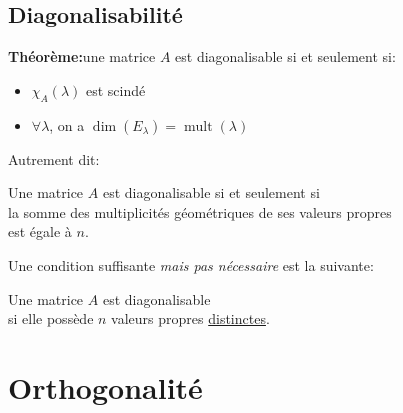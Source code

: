 \documentclass{article}
\newcommand\thm{\textbf{Théorème:}}
\DeclareMathOperator{\mult}{mult}
\begin{document}
\subsection{Diagonalisabilité}
\thm une matrice \(A\) est diagonalisable si et seulement si:
\begin{itemize}
	\item \(\chi_A(\lambda)\) est scindé
	\item \(\forall \lambda\), on a \(\dim(E_\lambda) = \mult(\lambda)\)
\end{itemize}
Autrement dit:
\begin{center}
	Une matrice \(A\) est diagonalisable si et seulement si \\ la somme des multiplicités géométriques de ses valeurs propres \\ est égale à \(n\).
\end{center}
Une condition suffisante \emph{mais pas nécessaire} est la suivante:
\begin{center}
	Une matrice \(A\) est diagonalisable \\ si elle possède \(n\) valeurs propres \underline{distinctes}.
\end{center}

\section{Orthogonalité}
\end{document}
